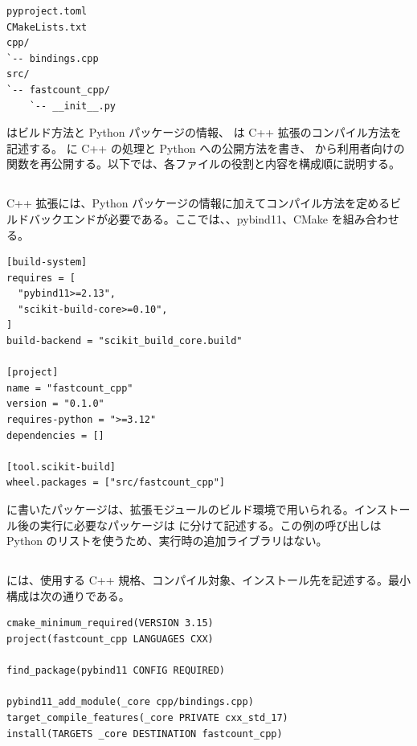 \begin{lstlisting}[numbers=none, xleftmargin=2\zw, title={fastcount\_cpp/ の例}]
pyproject.toml
CMakeLists.txt
cpp/
`-- bindings.cpp
src/
`-- fastcount_cpp/
    `-- __init__.py
\end{lstlisting}

 はビルド方法と Python パッケージの情報、 は C++ 拡張のコンパイル方法を記述する。 に C++ の処理と Python への公開方法を書き、 から利用者向けの関数を再公開する。以下では、各ファイルの役割と内容を構成順に説明する。

\subsection{}

C++ 拡張には、Python パッケージの情報に加えてコンパイル方法を定めるビルドバックエンドが必要である。ここでは、、pybind11、CMake を組み合わせる。

\begin{lstlisting}[numbers=none, xleftmargin=2\zw, title={pyproject.toml}]
[build-system]
requires = [
  "pybind11>=2.13",
  "scikit-build-core>=0.10",
]
build-backend = "scikit_build_core.build"

[project]
name = "fastcount_cpp"
version = "0.1.0"
requires-python = ">=3.12"
dependencies = []

[tool.scikit-build]
wheel.packages = ["src/fastcount_cpp"]
\end{lstlisting}

 に書いたパッケージは、拡張モジュールのビルド環境で用いられる。インストール後の実行に必要なパッケージは  に分けて記述する。この例の呼び出しは Python のリストを使うため、実行時の追加ライブラリはない。

\subsection{}

 には、使用する C++ 規格、コンパイル対象、インストール先を記述する。最小構成は次の通りである。

\begin{lstlisting}[numbers=none, xleftmargin=2\zw, title={CMakeLists.txt}]
cmake_minimum_required(VERSION 3.15)
project(fastcount_cpp LANGUAGES CXX)

find_package(pybind11 CONFIG REQUIRED)

pybind11_add_module(_core cpp/bindings.cpp)
target_compile_features(_core PRIVATE cxx_std_17)
install(TARGETS _core DESTINATION fastcount_cpp)
\end{lstlisting}

